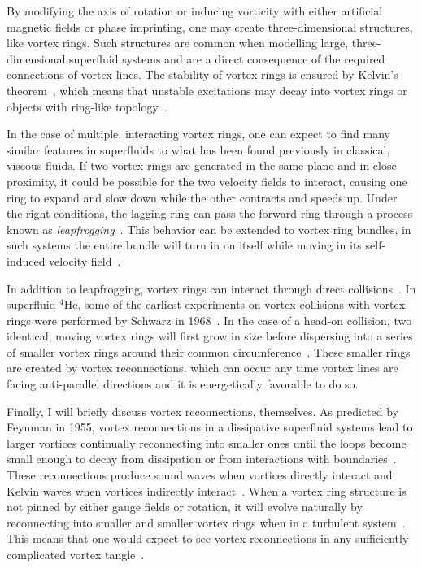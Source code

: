 By modifying the axis of rotation or inducing vorticity with either artificial magnetic fields or phase imprinting, one may create three-dimensional structures, like vortex rings.
Such structures are common when modelling large, three-dimensional superfluid systems and are a direct consequence of the required connections of vortex lines.
The stability of vortex rings is ensured by Kelvin's theorem~\cite{donnelly1991}, which means that unstable excitations may decay into vortex rings or objects with ring-like topology~\cite{anderson2001}.

In the case of multiple, interacting vortex rings, one can expect to find many similar features in superfluids to what has been found previously in classical, viscous fluids. 
If two vortex rings are generated in the same plane and in close proximity, it could be possible for the two velocity fields to interact, causing one ring to expand and slow down while the other contracts and speeds up. 
Under the right conditions, the lagging ring can pass the forward ring through a process known as \textit{leapfrogging}~\cite{sommerfield1950, caplan2014}.
This behavior can be extended to vortex ring bundles, in such systems the entire bundle will turn in on itself while moving in its self-induced velocity field~\cite{wacks2014}.

In addition to leapfrogging, vortex rings can interact through direct collisions~\cite{shariff1992}. 
In superfluid $^4$He, some of the earliest experiments on vortex collisions with vortex rings were performed by Schwarz in 1968~\cite{schwarz1968}.
In the case of a head-on collision, two identical, moving vortex rings will first grow in size before dispersing into a series of smaller vortex rings around their common circumference~\cite{lim1995}. 
These smaller rings are created by vortex reconnections, which can occur any time vortex lines are facing anti-parallel directions and it is energetically favorable to do so.

Finally, I will briefly discuss vortex reconnections, themselves.
As predicted by Feynman in 1955, vortex reconnections in a dissipative superfluid systems lead to larger vortices continually reconnecting into smaller ones until the loops become small enough to decay from dissipation or from interactions with boundaries~\cite{feynman1955}.
These reconnections produce sound waves when vortices directly interact and Kelvin waves when vortices indirectly interact~\cite{paoletti2011}.
When a vortex ring structure is not pinned by either gauge fields or rotation, it will evolve naturally by reconnecting into smaller and smaller vortex rings when in a turbulent system~\cite{jackson1999}. 
This means that one would expect to see vortex reconnections in any sufficiently complicated vortex tangle~\cite{barenghi2014}.

